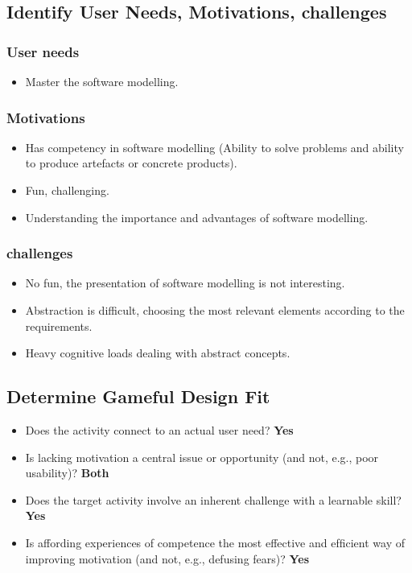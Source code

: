 \documentclass[12pt, a4paper]{report} \usepackage[titletoc]{appendix}
\begin{document}
\begin{appendices}
\subsection{Identify User Needs, Motivations, challenges}
\subsubsection{User needs}
\begin{itemize}
\item Master the software modelling.
\end{itemize}
\subsubsection{Motivations}
\begin{itemize}
\item Has competency in software modelling (Ability to solve problems and ability to produce artefacts or concrete products).
\item Fun, challenging.
\item Understanding the importance and advantages of software modelling.
\end{itemize}
\subsubsection{challenges}
\begin{itemize}
\item No fun, the presentation of software modelling is not interesting.
\item Abstraction is difficult, choosing the most relevant elements according to the requirements.
\item Heavy cognitive loads dealing with abstract concepts.
\end{itemize}

\subsection{Determine Gameful Design Fit}
\begin{itemize}
\item Does the activity connect to an actual user need? \textbf{Yes}
\item Is lacking motivation a central issue or opportunity (and not, e.g., poor usability)? \textbf{Both}
\item Does the target activity involve an inherent challenge with a learnable skill? \textbf{Yes}
\item Is affording experiences of competence the most effective and efﬁcient way of improving motivation (and not, e.g., defusing fears)? \textbf{Yes}
\end{itemize}


\end{appendices}
\end{document}

